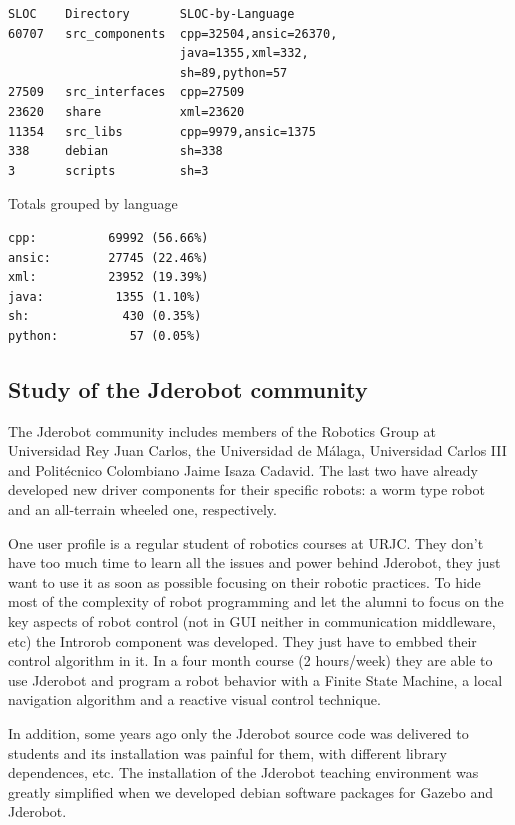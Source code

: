 \documentclass[twocolumn]{svjour3}          %
\begin{document}
\begin{verbatim}
SLOC    Directory       SLOC-by-Language 
60707   src_components  cpp=32504,ansic=26370,
                        java=1355,xml=332,
                        sh=89,python=57
27509   src_interfaces  cpp=27509
23620   share           xml=23620
11354   src_libs        cpp=9979,ansic=1375
338     debian          sh=338
3       scripts         sh=3
\end{verbatim}

Totals grouped by language
\begin{verbatim}
cpp:          69992 (56.66%)
ansic:        27745 (22.46%)
xml:          23952 (19.39%)
java:          1355 (1.10%)
sh:             430 (0.35%)
python:          57 (0.05%)
\end{verbatim}

\subsection{Study of the Jderobot community}
The Jderobot community includes members of the Robotics Group at Universidad Rey Juan Carlos, the Universidad de Málaga, Universidad Carlos III and Politécnico Colombiano Jaime Isaza Cadavid. The last two have already developed new driver components for their specific robots: a worm type robot and an all-terrain wheeled one, respectively.

One user profile is a regular student of robotics courses at URJC. They don't have too much time to learn all the issues and power behind Jderobot, they just want to use it as soon as possible focusing on their robotic practices. To hide most of the complexity of robot programming and let the alumni to focus on the key aspects of robot control (not in GUI neither in communication middleware, etc) the Introrob component was developed. They just have to embbed their control algorithm in it. In a four month course (2 hours/week) they are able to use Jderobot and program a robot behavior with a Finite State Machine, a local navigation algorithm and a reactive visual control technique. 

In addition, some years ago only the Jderobot source code was delivered to students and its installation was painful for them, with different library dependences, etc. The installation of the Jderobot teaching environment was greatly simplified when we developed debian software packages for Gazebo and Jderobot.
\end{document}
